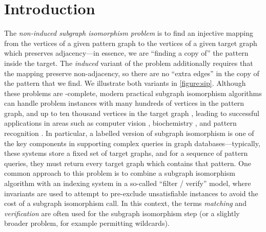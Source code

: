 \documentclass[twoside,11pt]{article}
\newcommand{\citep}[1]{\cite{#1}}
\begin{document}
\section{Introduction}\label{section:introduction}

The \emph{non-induced subgraph isomorphism problem} is to find an injective mapping from the
vertices of a given pattern graph to the vertices of a given target graph which preserves
adjacency---in essence, we are ``finding a copy of'' the pattern inside the target. The
\emph{induced} variant of the problem additionally requires that the mapping preserve non-adjacency,
so there are no ``extra edges'' in the copy of the pattern that we find. We illustrate both variants
in \cref{figure:sip}.  Although these problems are \NP-complete, modern practical subgraph
isomorphism algorithms can handle problem instances with many hundreds of vertices in the pattern
graph, and up to ten thousand vertices in the target graph
\cite{Cordella:2004,Solnon:2010,Audemard:2014,McCreesh:2015}, leading to successful applications in
areas such as computer vision \cite{Damiand:2011,Solnon:2015}, biochemistry
\cite{Giugno:2013,Carletti:2015}, and pattern recognition \citep{Conte:2004}.  In particular, a
labelled version of subgraph isomorphism is one of the key components in supporting complex queries
in graph databases---typically, these systems store a fixed set of target graphs, and for a sequence
of pattern queries, they must return every target graph which contains that pattern.  One common
approach to this problem is to combine a subgraph isomorphism algorithm with an indexing system in a
so-called ``filter / verify'' model, where invariants are used to attempt to pre-exclude
unsatisfiable instances to avoid the cost of a subgraph isomorphism call. In this context, the terms
\emph{matching} and \emph{verification} are often used for the subgraph isomorphism step (or a
slightly broader problem, for example permitting wildcards).
\end{document}
